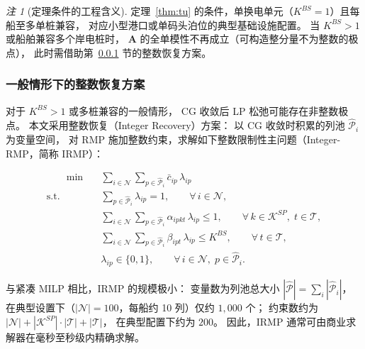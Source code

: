 \documentclass[UTF8, a4paper, 12pt]{ctexart}
\theoremstyle{plain}
\theoremstyle{definition}
\theoremstyle{remark}
\newtheorem{remark}{注}
\begin{document}
\begin{remark}[定理条件的工程含义]
定理~\ref{thm:tu} 的条件，单换电单元（$K^{BS}=1$）且每船至多单桩兼容，
对应小型港口或单码头泊位的典型基础设施配置。
当 $K^{BS}>1$ 或船舶兼容多个岸电桩时，
$\mathbf{A}$ 的全单模性不再成立（可构造整分量不为整数的极点），
此时需借助第~\ref{sec:cg_ir} 节的整数恢复方案。
\end{remark}

\subsubsection{一般情形下的整数恢复方案}
\label{sec:cg_ir}

对于 $K^{BS}>1$ 或多桩兼容的一般情形，
CG 收敛后 LP 松弛可能存在非整数极点。
本文采用整数恢复（Integer Recovery）方案：
以 CG 收敛时积累的列池 $\hat{\mathcal{P}}_i$ 为变量空间，
对 RMP 施加整数约束，求解如下整数限制性主问题（Integer-RMP，简称 IRMP）：

\begin{align}
  [\text{IRMP}] \qquad
  \min \quad & \sum_{i \in \mathcal{N}} \sum_{p \in \hat{\mathcal{P}}_i}
    \bar{c}_{ip}\, \lambda_{ip}
  \label{eq:irmp_obj} \\
  \text{s.t.} \quad
  & \sum_{p \in \hat{\mathcal{P}}_i} \lambda_{ip} = 1,
    \qquad \forall\, i \in \mathcal{N},
  \label{eq:irmp_convex} \\
  & \sum_{i \in \mathcal{N}} \sum_{p \in \hat{\mathcal{P}}_i}
    \alpha_{ipkt}\, \lambda_{ip} \le 1,
    \qquad \forall\, k \in \mathcal{K}^{SP},\; t \in \mathcal{T},
  \label{eq:irmp_sp} \\
  & \sum_{i \in \mathcal{N}} \sum_{p \in \hat{\mathcal{P}}_i}
    \beta_{ipt}\, \lambda_{ip} \le K^{BS},
    \qquad \forall\, t \in \mathcal{T},
  \label{eq:irmp_bs} \\
  & \lambda_{ip} \in \{0,1\},
    \qquad \forall\, i \in \mathcal{N},\; p \in \hat{\mathcal{P}}_i.
  \label{eq:irmp_int}
\end{align}

与紧凑 MILP 相比，IRMP 的规模极小：
变量数为列池总大小 $|\hat{\mathcal{P}}|=\sum_i|\hat{\mathcal{P}}_i|$，
在典型设置下（$|\mathcal{N}|=100$，每船约 10 列）仅约 $1{,}000$ 个；
约束数约为 $|\mathcal{N}|+|\mathcal{K}^{SP}|\cdot|\mathcal{T}|+|\mathcal{T}|$，
在典型配置下约为 $200$。
因此，IRMP 通常可由商业求解器在毫秒至秒级内精确求解。
\end{document}
